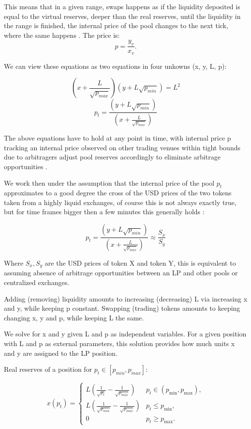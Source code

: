 \documentclass{article}
\begin{document}
This means that in a given range, swaps happens as if the liquidity deposited is equal to the virtual reserves, deeper than the real reserves, until the liquidity in the range is finished, the internal price of the pool changes to the next tick, where the same happens \newline.
The price is:
$$p = \frac{y_v}{x_v}.$$

We can view these equations as two equations in four unkowns (x, y, L, p):

$$ (x + \frac{L}{\sqrt{p_{max}}})(y + L \sqrt{p_{min}})= L^2$$
$$ p_t =  \frac{(y + L \sqrt{p_{min}})}{(x + \frac{L}{\sqrt{p_{max}}})}$$

The above equations have to hold at any point in time, with internal price p tracking an internal price observed on other trading venues within tight bounds due to arbitragers adjust pool reserves accordingly to eliminate arbitrage opportunities \cite{heimbach2022}.

We work then under the assumption that the internal price of the pool $p_t$ approximates to a good degree the cross of the USD prices of the two tokens taken from a highly liquid exchanges, of course this is not always exactly true, but for time frames bigger then a few minutes this generally holds \cite{wang2022}: 

\begin{equation}
p_t =  \frac{(y + L \sqrt{p_{min}})}{(x + \frac{L}{\sqrt{p_{max}}})}\approx \frac{S_x}{S_y}
\label{p_t}
\end{equation}

Where $S_x , S_y$ are the USD prices of token X and token Y, this is equivalent to assuming absence of arbitrage opportunities between an LP and other pools or centralized exchanges.

Adding (removing) liquidity amounts to increasing (decreasing) L via increasing x and y, while keeping p constant. Swapping (trading) tokens amounts to keeping changing x, y and p, while keeping L the same. \cite{lipton2024}



We solve for x and y given L and p as independent variables. For a given position with L and p as external parameters, this solution provides how much units x and y are assigned to the LP position.

Real reserves of a position for $p_t \in [p_{min}, p_{max}]$:

\begin{equation}
x(p_t) = 
\begin{cases} 
L \left( \frac{1}{\sqrt{p_t}} - \frac{1}{\sqrt{p_{max}}} \right) & p_t \in (p_{\min}, p_{\max}), \\
L \left( \frac{1}{\sqrt{p_{min}}} - \frac{1}{\sqrt{p_{max}}} \right) & p_t \leq p_{\min}, \\
0 & p_t \geq p_{\max}.
\end{cases}
\label{x_t}
\end{equation}
\end{document}
